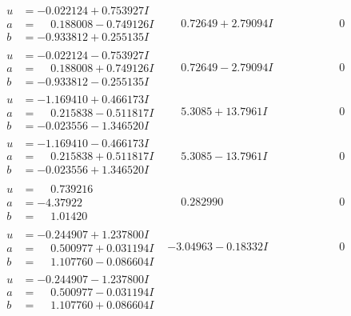 \documentclass[1p]{elsarticle_modified}
\theoremstyle{definition}
\begin{document}
$$\begin{array}{c|c|c}
\begin{aligned}
u &= -0.022124 + 0.753927 I \\
a &= \phantom{-}0.188008 - 0.749126 I \\
b &= -0.933812 + 0.255135 I\end{aligned}
 & \phantom{-}0.72649 + 2.79094 I & \phantom{-0.000000 } 0 \\ \hline\begin{aligned}
u &= -0.022124 - 0.753927 I \\
a &= \phantom{-}0.188008 + 0.749126 I \\
b &= -0.933812 - 0.255135 I\end{aligned}
 & \phantom{-}0.72649 - 2.79094 I & \phantom{-0.000000 } 0 \\ \hline\begin{aligned}
u &= -1.169410 + 0.466173 I \\
a &= \phantom{-}0.215838 - 0.511817 I \\
b &= -0.023556 - 1.346520 I\end{aligned}
 & \phantom{-}5.3085 + 13.7961 I & \phantom{-0.000000 } 0 \\ \hline\begin{aligned}
u &= -1.169410 - 0.466173 I \\
a &= \phantom{-}0.215838 + 0.511817 I \\
b &= -0.023556 + 1.346520 I\end{aligned}
 & \phantom{-}5.3085 - 13.7961 I & \phantom{-0.000000 } 0 \\ \hline\begin{aligned}
u &= \phantom{-}0.739216\phantom{ +0.000000I} \\
a &= -4.37922\phantom{ +0.000000I} \\
b &= \phantom{-}1.01420\phantom{ +0.000000I}\end{aligned}
 & \phantom{-}0.282990\phantom{ +0.000000I} & \phantom{-0.000000 } 0 \\ \hline\begin{aligned}
u &= -0.244907 + 1.237800 I \\
a &= \phantom{-}0.500977 + 0.031194 I \\
b &= \phantom{-}1.107760 - 0.086604 I\end{aligned}
 & -3.04963 - 0.18332 I & \phantom{-0.000000 } 0 \\ \hline\begin{aligned}
u &= -0.244907 - 1.237800 I \\
a &= \phantom{-}0.500977 - 0.031194 I \\
b &= \phantom{-}1.107760 + 0.086604 I\end{aligned}

\end{array}$$
\end{document}
